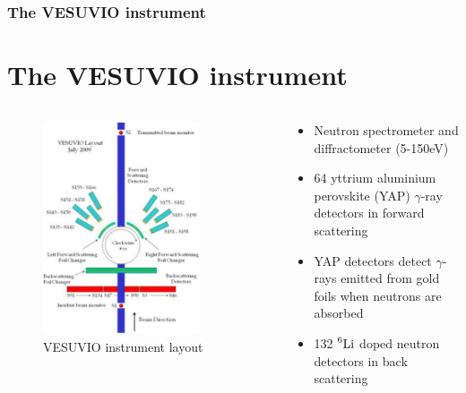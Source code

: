 \documentclass[10pt,serif,t]{beamer}
\newenvironment{Slide}[1]
{
\begin{frame}[fragile,environment=Slide]
  \frametitle{#1}
  \section{#1}
}
{
\end{frame}
}
\begin{document}
\begin{Slide}{The VESUVIO instrument}
  \begin{columns}[T]
    \begin{column}{.55\textwidth}
      \begin{figure}[h!]
        \centering
        \includegraphics[width=0.8\textwidth]{graphics/evs_layout_july2009.eps}
        \caption{VESUVIO instrument layout \cite{calibration_of_evs}}
        \label{fig:vesuvio_layout}
      \end{figure}
    \end{column}
    \hfill
    \begin{column}{.44\textwidth}
      \begin{itemize}
        \item Neutron spectrometer and diffractometer (5-150eV)
        \item 64 yttrium aluminium perovskite (YAP) $\gamma$-ray detectors in
              forward scattering
        \item YAP detectors detect $\gamma$-rays emitted from gold foils when
              neutrons are absorbed
        \item 132 $\prescript{6}{}{\mathrm{Li}}$ doped neutron detectors in back
              scattering
      \end{itemize}
    \end{column}
  \end{columns}
\end{Slide}
\end{document}
